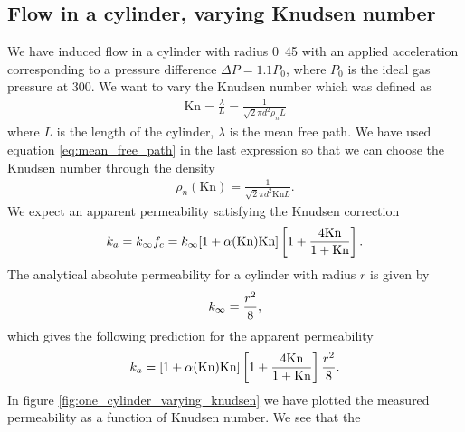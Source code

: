 \subsection{Flow in a cylinder, varying Knudsen number}
We have induced flow in a cylinder with radius \unit{0.45}{\micro\meter} with an applied acceleration corresponding to a pressure difference $\Delta P = 1.1P_0$, where $P_0$ is the ideal gas pressure at \unit{300}{\kelvin}. We want to vary the Knudsen number which was defined as
\begin{align}
	\text{Kn} = \frac{\lambda}{L} = \frac{1}{\sqrt 2 \pi d^2 \rho_n L}
\end{align}
where $L$ is the length of the cylinder, $\lambda$ is the mean free path. We have used equation \eqref{eq:mean_free_path} in the last expression so that we can choose the Knudsen number through the density
\begin{align}
	\rho_n(\text{Kn}) = \frac{1}{\sqrt 2 \pi d^2 \text{Kn}L}.
\end{align}
We expect an apparent permeability satisfying the Knudsen correction
\begin{align}
	k_a = k_\infty f_c = k_\infty[1 + \alpha(\text{Kn})\text{Kn}]\left[1 + {4\text{Kn}\over 1 + \text{Kn}}\right].
\end{align}
The analytical absolute permeability for a cylinder with radius $r$ is given by\cite{karniadakis2005microflows}
\begin{align}
	\label{eq:permeability_cylinder}
	k_\infty = {r^2\over 8},
\end{align}
which gives the following prediction for the apparent permeability
\begin{align}
	k_a = [1 + \alpha(\text{Kn})\text{Kn}]\left[1 + {4\text{Kn}\over 1 + \text{Kn}}\right] {r^2\over 8}.
\end{align}
In figure \ref{fig:one_cylinder_varying_knudsen} we have plotted the measured permeability as a function of Knudsen number. We see that the 

